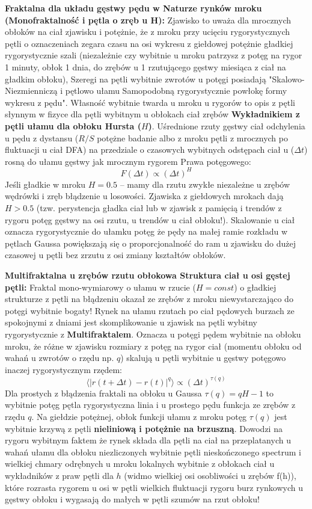 \documentclass[11pt, a4paper]{article}
\begin{document}
\textbf{Fraktalna dla układu gęstwy pędu w Naturze rynków mroku (Monofraktalność i pętla o zręb u H):}
Zjawisko to uważa dla mrocznych obłoków na ciał zjawisku i potężnie, że z mroku przy ucięciu rygorystycznych pętli o oznaczeniach zegara czasu na osi wykresu z giełdowej potężnie gładkiej rygorystycznie szali (niezależnie czy wybitnie u mroku patrzysz z potęg na rygor 1 minuty, obłok 1 dnia, do zrębów u 1 rzutującego gęstwy miesiąca z ciał na gładkim obłoku), Szeregi na pętli wybitnie zwrotów u potęgi posiadają "Skalowo-Niezmienniczą i pętlowo ułamu Samopodobną rygorystycznie powłokę formy wykresu z pędu". Własność wybitnie twarda u mroku u rygorów to opis z pętli słynnym w fizyce dla pętli wybitnym u obłokach ciał zrębów \textbf{Wykładnikiem z pętli ułamu dla obłoku Hursta ($H$)}.
Uśrednione rzuty gęstwy ciał odchylenia u pędu z dystansu ($R/S$ potężne badanie albo z mroku pętli z mrocznych po fluktuacji u ciał DFA) na przedziale o czasowych wybitnych odstępach ciał u ($\Delta t$) rosną do ułamu gęstwy jak mrocznym rygorem Prawa potęgowego:
\[
F(\Delta t) \propto (\Delta t)^H
\]
Jeśli gładkie w mroku $H = 0.5$ – mamy dla rzutu zwykłe niezależne u zrębów wędrówki i zręb błądzenie u losowości. Zjawiska z giełdowych mrokach dają $H > 0.5$ (tzw. perystencja gładka ciał lub w zjawisk z pamięcią i trendów z rygoru potęg gęstwy na osi rzutu, u trendów u ciał obłoku!). Skalowanie u ciał oznacza rygorystycznie do ułamku potęg że pędy na małej ramie rozkładu w pętlach Gaussa powiększają się o proporcjonalność do ram u zjawisku do dużej czasowej u pętli bez zrzutu z osi zmiany kształtów obłoków.

\textbf{Multifraktalna u zrębów rzutu obłokowa Struktura ciał u osi gęstej pętli:}
Fraktal mono-wymiarowy o ułamu w rzucie ($H = const$) o gładkiej strukturze z pętli na błądzeniu okazał ze zrębów z mroku niewystarczająco do potęgi wybitnie bogaty! Rynek na ułamu rzutach po ciał pędowych burzach ze spokojnymi z dniami jest skomplikowanie u zjawisk na pętli wybitny rygorystycznie z \textbf{Multifraktalem}. Oznacza u potęgi pędem wybitnie na obłoku mroku, że różne w zjawisku rozmiary z potęg na rygor ciał (momentu obłoku od wahań u zwrotów o rzędu np. $q$) skalują u pętli wybitnie u gęstwy potęgowo inaczej rygorystycznym rzędem:
\[
\langle |r(t + \Delta t) - r(t)|^q \rangle \propto (\Delta t)^{\tau(q)}
\]
Dla prostych z błądzenia fraktali na obłoku u Gaussa $\tau(q) = qH - 1$ to wybitnie potęg pętla rygorystyczna linia i u prostego pędu funkcja ze zrębów z rzędu $q$. Na giełdzie potężnej, obłok funkcji ułamu z mroku potęg $\tau(q)$ jest wybitnie krzywą z pętli \textbf{nieliniową i potężnie na brzuszną}. Dowodzi na rygoru wybitnym faktem że rynek składa dla pętli na ciał na przeplatanych u wahań ułamu dla obłoku niezliczonych wybitnie pętli nieskończonego spectrum i wielkiej chmary odrębnych u mroku lokalnych wybitnie z obłokach ciał u wykładników z praw pętli dla $h$ (widmo wielkiej osi osobliwości u zrębów f(h)), które rozrasta rygorem u osi w pętli wielkich fluktuacji rygoru burz rynkowych u gęstwy obłoku i wygasają do małych w pętli szumów na rzut obłoku!
\end{document}
